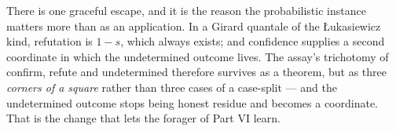 There is one graceful escape, and it is the reason the probabilistic instance
matters more than as an application. In a Girard quantale of the
\L{}ukasiewicz kind, refutation is $1-s$, which always exists; and confidence
supplies a second coordinate in which the undetermined outcome lives. The
assay's trichotomy of confirm, refute and undetermined therefore survives as a
theorem, but as three \emph{corners of a square} rather than three cases of a
case-split --- and the undetermined outcome stops being honest residue and becomes
a coordinate. That is the change that lets the forager of Part VI learn.
